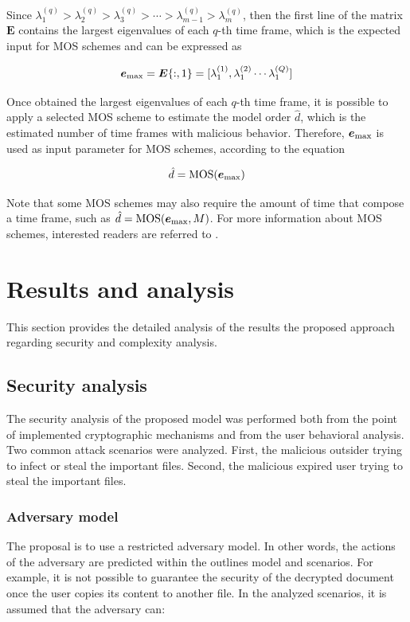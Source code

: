 \documentclass[twocolumn]{svjour3}          	%
\begin{document}
Since $\lambda_1^{(q)} > \lambda_2^{(q)} > \lambda_3^{(q)} > \cdots > \lambda_{m-1}^{(q)} > \lambda_m^{(q)}$, then the first line of the matrix $\mathbf{E}$ contains the largest eigenvalues of each $q$-th time frame, which is the expected input for MOS schemes and can be expressed as 

\begin{equation}\label{eq:eq09}
\boldsymbol{e}_{\rm max} = \boldsymbol{E}\{:,1\} = [ \lambda_1^{(1)}, \lambda_1^{(2)} \cdots \lambda_1^{(Q)}]
\end{equation}

Once obtained the largest eigenvalues of each $q$-th time frame, it is possible to apply a selected MOS scheme to estimate the model order $\hat{d}$, which is the estimated number of time frames with malicious behavior. Therefore, $\boldsymbol{e}_{\rm max}$ is used as input parameter for MOS schemes, according to the equation

\begin{equation}\label{eq:eq09}
\hat{d} = \textrm{MOS}(\boldsymbol{e}_{\rm max})
\end{equation}

Note that some MOS schemes may also require the amount of time that compose a time frame, such as $\hat{d} = \textrm{MOS}(\boldsymbol{e}_{\rm max}, M)$. For more information about MOS schemes, interested readers are referred to \cite{da2009comparison}.

\section{Results and analysis}
\label{sec_results}

This section provides the detailed analysis of the results the proposed approach regarding security and complexity analysis.

\subsection{Security analysis}
\label{sec_sec_analysis}
The security analysis of the proposed model was performed both from the point of implemented cryptographic mechanisms and from the user behavioral analysis. Two common attack scenarios were analyzed. First, the malicious outsider trying to infect or steal the important files. Second, the malicious expired user trying to steal the important files. 

\subsubsection{Adversary model}
\label{sec_adversary_model}
The proposal is to use a restricted adversary model. In other words, the actions of the adversary are predicted within the outlines model and scenarios. For example, it is not possible to guarantee the security of the decrypted document once the user copies its content to another file. In the analyzed scenarios, it is assumed that the adversary can:
\end{document}
